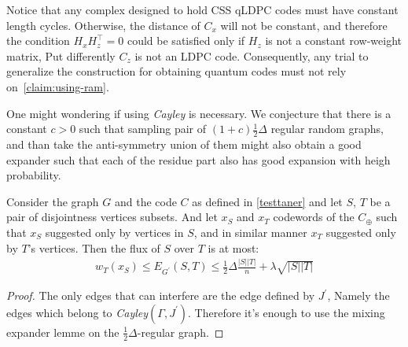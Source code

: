 \begin{remark}
  Notice that any complex designed to hold CSS qLDPC codes must have constant length cycles. Otherwise, the distance of $C_{x}$ will not be constant, and therefore the condition $H_{x}H_{z}^{\top} =0$ could be satisfied only if $H_{z}$ is not a constant row-weight matrix, Put differently $C_{z}$ is not an LDPC code. Consequently, any trial to generalize the construction for obtaining quantum codes must not rely on~\cref{claim:using-ram}.    
\end{remark}
\begin{remark}
  One might wondering if using \emph{Cayley} is necessary. We conjecture that there is a constant $c > 0$ such that sampling pair of  $\left( 1 + c \right)\frac{1}{2}\Delta$ regular random graphs, and than take the anti-symmetry union of them might also obtain a good expander such that each of the residue part also has good expansion with heigh probability.  
\end{remark}



\begin{claim} Consider the graph $G$ and the code $C$ as defined in \ref{testtaner} and let $S$, $T$ be a pair of disjointness vertices subsets. And let $x_{S}$ and $x_{T}$ codewords of the $C_{\oplus}$ such that $x_{S}$ suggested only by vertices in $S$, and in similar manner $x_{T}$ suggested only by $T$'s vertices. Then the flux of $S$ over $T$ is at most: 
  \begin{equation*}
    \begin{split}
      w_{T}\left( x_{S} \right) \le  E_{G^{\prime}}(S,T) \le \frac{1}{2} \Delta\frac{|S||T|}{n} + \lambda\sqrt{|S||T|} 
    \end{split}
  \end{equation*} 
\end{claim}
\begin{proof} The only edges that can interfere are the edge defined by $J^{\prime}$, Namely the edges which belong to \emph{Cayley}$\left( \Gamma, J^{\prime} \right)$. Therefore it's enough to use the mixing expander lemme on the $\frac{1}{2}\Delta$-regular graph. \end{proof}


